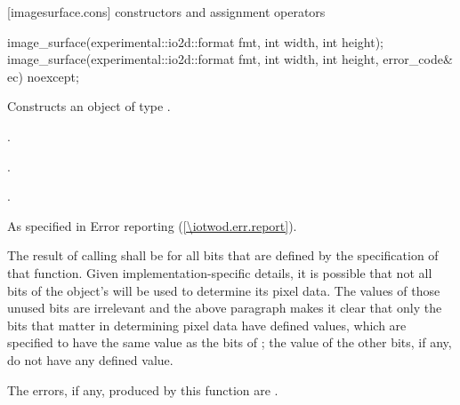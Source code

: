  [imagesurface.cons] { constructors and assignment operators}

\begin{itemdecl}
image_surface(experimental::io2d::format fmt, int width, int height);
image_surface(experimental::io2d::format fmt, int width, int height, 
  error_code& ec) noexcept;
\end{itemdecl}
\begin{itemdescr}
\pnum
\effects
Constructs an object of type .

\pnum
\postconditions
{}.

\pnum
{}.

\pnum
{}.

\pnum
\throws
As specified in Error reporting (\ref{\iotwod.err.report}).

\pnum
\remarks
The result of calling  shall be  for all bits that are defined by the specification of that function.
\enternote
Given implementation-specific details, it is possible that not all bits of the  object's \underlyingimagesurface will be used to determine its pixel data. The values of those unused bits are irrelevant and the above paragraph makes it clear that only the bits that matter in determining pixel data have defined values, which are specified to have the same value as the bits of ; the value of the other bits, if any, do not have any defined value.
\exitnote

\pnum
\errors
The errors, if any, produced by this function are .
\end{itemdescr}

